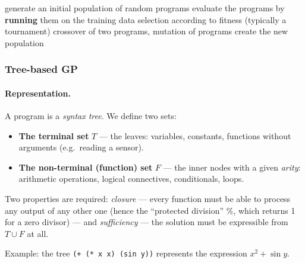 \documentclass[11pt,a4paper]{article}
\theoremstyle{definition}
\providecommand{\uv}[1]{``#1''}
\begin{document}
\begin{algorithm}[!ht]
\caption{The general scheme of GP}
\begin{algorithmic}[1]
\State generate an initial population of random programs
  \State evaluate the programs by \textbf{running} them on the training data
  \State selection according to fitness (typically a tournament)
  \State crossover of two programs, mutation of programs
  \State create the new population
\EndWhile
\end{algorithmic}
\end{algorithm}

\subsubsection{Tree-based GP}

\paragraph{Representation.} A program is a \emph{syntax tree}. We define two
sets:
\begin{itemize}
\item \textbf{The terminal set} $T$ --- the leaves: variables, constants,
  functions without arguments (e.g.\ reading a sensor).
\item \textbf{The non-terminal (function) set} $F$ --- the inner nodes with a
  given \emph{arity}: arithmetic operations, logical connectives, conditionals,
  loops.
\end{itemize}
Two properties are required: \emph{closure} --- every function must be able to
process any output of any other one (hence the \uv{protected division} $\%$,
which returns 1 for a zero divisor) --- and \emph{sufficiency} --- the solution
must be expressible from $T \cup F$ at all.

Example: the tree \texttt{(+ (* x x) (sin y))} represents the expression
$x^2 + \sin y$.
\end{document}
